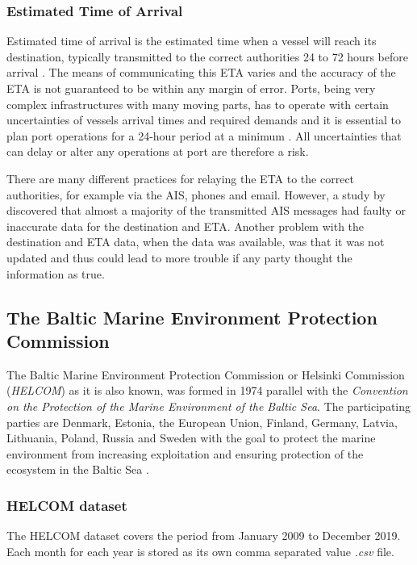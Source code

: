 \documentclass[../main.tex]{subfiles}
\begin{document}
\subsubsection{Estimated Time of Arrival}

Estimated time of arrival is the estimated time when a vessel will reach its destination, typically transmitted to the correct authorities 24 to 72 hours before arrival \cite{Veenstra_2021, EU_2009}. The means of communicating this ETA varies and the accuracy of the ETA is not guaranteed to be within any margin of error. Ports, being very complex infrastructures with many moving parts, has to operate with certain uncertainties of vessels arrival times and required demands and it is essential to plan port operations for a 24-hour period at a minimum \cite{Fancello_2011}. All uncertainties that can delay or alter any operations at port are therefore a risk.

There are many different practices for relaying the ETA to the correct authorities, for example via the AIS, phones and email. However, a study by  \cite{Mokhtari_2008} discovered that almost a majority of the transmitted AIS messages had faulty or inaccurate data for the destination and ETA. Another problem with the destination and ETA data, when the data was available, was that it was not updated and thus could lead to more trouble if any party thought the information as true.

\subsection{The Baltic Marine Environment Protection Commission}

The Baltic Marine Environment Protection Commission or Helsinki Commission (\textit{HELCOM}) as it is also known, was formed in 1974 parallel with the \textit{Convention on the Protection of the Marine Environment of the Baltic Sea}. The participating parties are Denmark, Estonia, the European Union, Finland, Germany, Latvia, Lithuania, Poland, Russia and Sweden with the goal to protect the marine environment from increasing exploitation and ensuring protection of the ecosystem in the Baltic Sea \cite{HELCOM_2014}.

\subsubsection{HELCOM dataset}

The HELCOM dataset covers the period from January 2009 to December 2019. Each month for each year is stored as its own comma separated value \textit{.csv} file.
\end{document}
